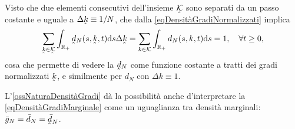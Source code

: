       \begin{oss}
        \label{ossNaturaDensitàGradi}
        Visto che due elementi consecutivi dell'insieme \(\underhat{\mathcal K}\) sono separati da un passo costante e uguale a \(\Delta\underhat k\equiv1/N\), che dalla \cref{eqDensitàGradiNormalizzati} implica
        \[
          \sum_{\underhat k\in\underhat{\mathcal K}}\int_{\RPlus}
          \underhat d_N(s,\underhat k,t)\de s\Delta\underhat k
          =\sum_{k\in\mathcal K}\int_{\RPlus}d_N(s,k,t)\de s=1,\quad\forall t\geq0,
        \]
        cosa che permette di vedere la \(\underhat d_N\) come funzione costante a tratti dei gradi normalizzati \(\underhat k\), e similmente per \(d_N\) con \(\Delta k\equiv1\).%
      \end{oss}

      \begin{oss}
        L'\cref{ossNaturaDensitàGradi} dà la possibilità anche d'interpretare la \cref{eqDensitàGradiMarginale} come un uguaglianza tra densità marginali: \(\bar g_N=\bar d_N=\bar{\underhat d}_N\).
      \end{oss}

